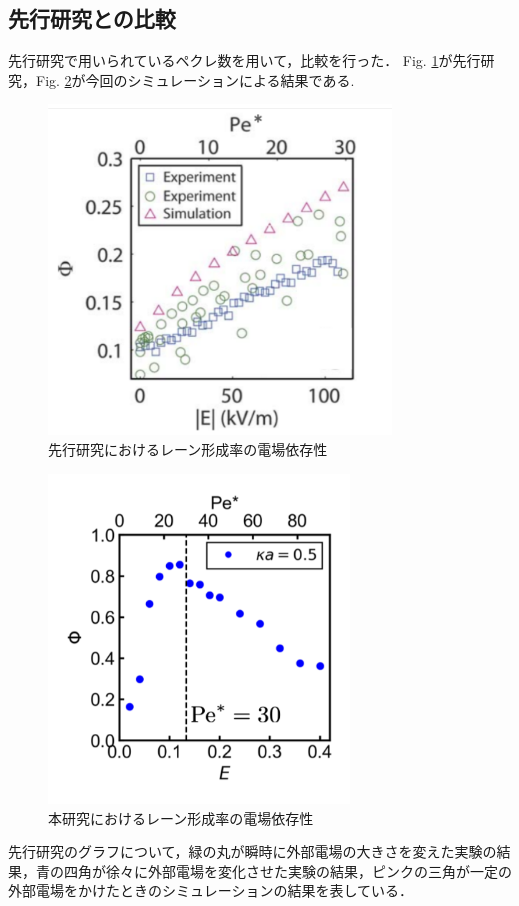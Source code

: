 \subsection{先行研究との比較}
\par 先行研究で用いられているペクレ数を用いて，比較を行った．
Fig. \ref{prework}が先行研究，Fig. \ref{EvsPhi}が今回のシミュレーションによる結果である.
\begin{figure}[H]
\centering
\includegraphics[width=9.1cm]{figures/EvsPhiPre.pdf}
\caption{先行研究におけるレーン形成率の電場依存性}
\label{prework}
\end{figure}
%
\begin{figure}[H]
\centering
\includegraphics[width=8.0cm]{figures/EvsPhi.pdf}
\caption{本研究におけるレーン形成率の電場依存性}
\label{EvsPhi}
\end{figure}
%
\noindent
先行研究のグラフについて，緑の丸が瞬時に外部電場の大きさを変えた実験の結果，青の四角が徐々に外部電場を変化させた実験の結果，ピンクの三角が一定の外部電場をかけたときのシミュレーションの結果を表している．
